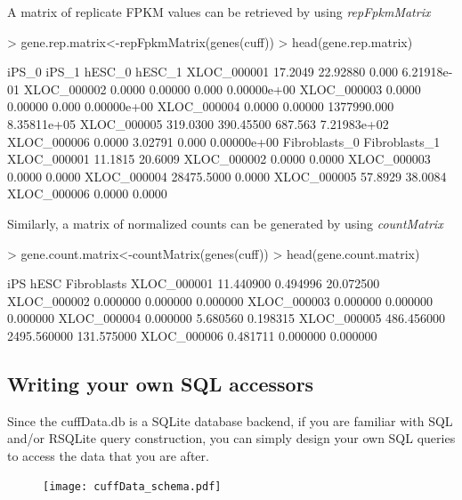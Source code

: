 \documentclass[10pt]{article}
\newcommand{\Rmethod}[1]{{\textit{#1}}}
\begin{document}
A matrix of replicate FPKM values can be retrieved by using \Rmethod{repFpkmMatrix}
\begin{Schunk}
\begin{Sinput}
> gene.rep.matrix<-repFpkmMatrix(genes(cuff))
> head(gene.rep.matrix)
\end{Sinput}
\begin{Soutput}
               iPS_0     iPS_1      hESC_0      hESC_1
XLOC_000001  17.2049  22.92880       0.000 6.21918e-01
XLOC_000002   0.0000   0.00000       0.000 0.00000e+00
XLOC_000003   0.0000   0.00000       0.000 0.00000e+00
XLOC_000004   0.0000   0.00000 1377990.000 8.35811e+05
XLOC_000005 319.0300 390.45500     687.563 7.21983e+02
XLOC_000006   0.0000   3.02791       0.000 0.00000e+00
            Fibroblasts_0 Fibroblasts_1
XLOC_000001       11.1815       20.6009
XLOC_000002        0.0000        0.0000
XLOC_000003        0.0000        0.0000
XLOC_000004    28475.5000        0.0000
XLOC_000005       57.8929       38.0084
XLOC_000006        0.0000        0.0000
\end{Soutput}
\end{Schunk}

Similarly, a matrix of normalized counts can be generated by using \Rmethod{countMatrix}
\begin{Schunk}
\begin{Sinput}
> gene.count.matrix<-countMatrix(genes(cuff))
> head(gene.count.matrix)
\end{Sinput}
\begin{Soutput}
                   iPS        hESC Fibroblasts
XLOC_000001  11.440900    0.494996   20.072500
XLOC_000002   0.000000    0.000000    0.000000
XLOC_000003   0.000000    0.000000    0.000000
XLOC_000004   0.000000    5.680560    0.198315
XLOC_000005 486.456000 2495.560000  131.575000
XLOC_000006   0.481711    0.000000    0.000000
\end{Soutput}
\end{Schunk}

\subsection{Writing your own SQL accessors}
Since the cuffData.db is a SQLite database backend, if you are familiar with SQL and/or RSQLite query construction, you can simply design your own SQL queries to access the data that you are after. 

\begin{figure}[h]
\centering

\texttt{[image: cuffData\_schema.pdf]}

\end{figure}
\end{document}
